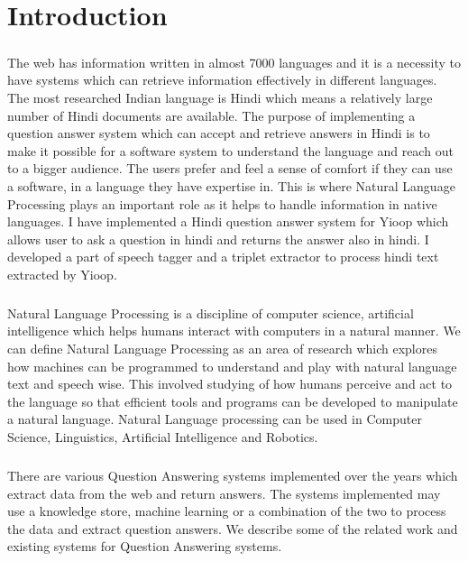 \chapter{Introduction}

\paragraph{}
The web has information written in almost 7000 languages and it is a necessity to have systems which can retrieve information effectively in different languages. The most researched Indian language is Hindi which means a relatively large number of Hindi documents are available. The purpose of implementing a question answer system which can accept and retrieve answers in Hindi is to make it possible for a software system to understand the language and reach out to a bigger audience. The users prefer and feel a sense of comfort if they can use a software, in a language they have expertise in. This is where Natural Language Processing \cite{chowdhury2003natural} plays an important role as it helps to handle information in native languages. I have implemented  a Hindi question answer system for Yioop which allows user to ask a question in hindi and returns the answer also in hindi. I developed a part of speech tagger and a triplet extractor to process hindi text extracted by Yioop.

\paragraph{}
Natural Language Processing is a discipline of computer science, artificial intelligence which helps humans interact with computers in a natural manner. We can define Natural Language Processing as an area of research which explores how machines can be programmed to understand and play with natural language text and speech wise. This involved studying of how humans perceive and act to the language so that efficient tools and programs can be developed to manipulate a natural language. Natural Language processing can be used in Computer Science, Linguistics, Artificial Intelligence and Robotics. 

\paragraph{}
There are various Question Answering systems implemented over the years which extract data from the web and return answers. The systems implemented may use a knowledge store, machine learning or a combination of the two to process the data and extract question answers. We describe some of the related work and existing systems for Question Answering systems.

